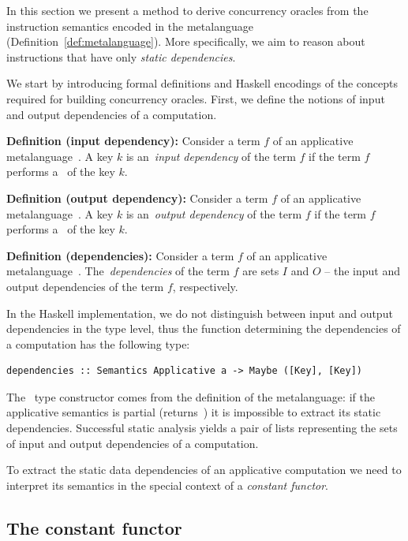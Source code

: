 In this section we present a method to derive concurrency oracles from the instruction
semantics encoded in the  metalanguage (Definition~\ref{def:metalanguage}).
More specifically, we aim to reason about instructions that
have only \emph{static dependencies}.

We start by introducing formal definitions and Haskell encodings of the concepts
required for building concurrency oracles.
First, we define the notions of input and output dependencies of a computation.

\textbf{Definition (input dependency):\label{def:in-dependencies}}
Consider a term $f$ of an applicative metalanguage~.
A key $k$ is an~\emph{input dependency} of the term $f$ if the term $f$
performs a~ of the key $k$.

\textbf{Definition (output dependency):\label{def:out-dependencies}}
Consider a term $f$ of an applicative metalanguage~.
A key $k$ is an~\emph{output dependency} of the term $f$ if the term $f$
performs a~ of the key $k$.

\textbf{Definition (dependencies):\label{def:dependencies}}
Consider a term $f$ of an applicative metalanguage~.
The~\emph{dependencies} of the term $f$ are sets $I$ and $O$ -- the input and
output dependencies of the term $f$, respectively.

In the Haskell implementation, we do not distinguish between input and output dependencies
in the type level, thus the function determining the dependencies of a computation
has the following type:

\begin{verbatim}
dependencies :: Semantics Applicative a -> Maybe ([Key], [Key])
\end{verbatim}

\noindent
The~ type constructor comes from the definition of the metalanguage:
if the applicative semantics is partial (returns~) it is impossible
to extract its static dependencies. Successful static analysis yields a pair of
lists representing the sets of input and output dependencies of a computation.

To extract the static data dependencies of an applicative computation we need to
interpret its semantics in the special context of a \emph{constant functor}.

\subsection{The constant functor}

